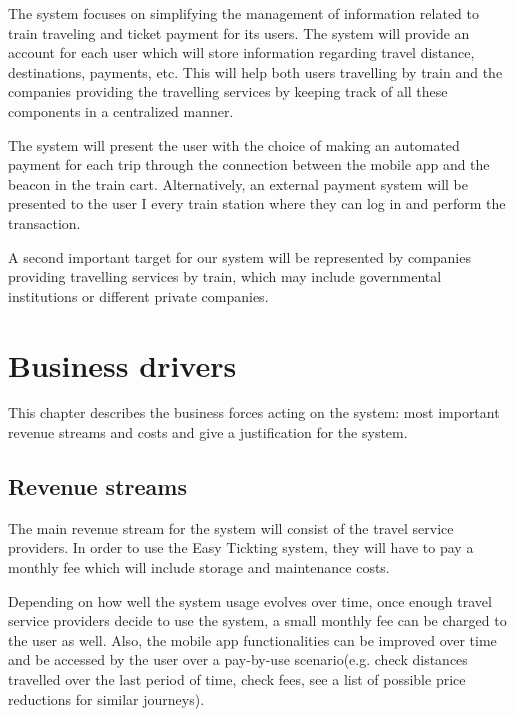 The system focuses on simplifying the management of information related to train traveling and ticket payment for its users. The system will provide an account for each user which will store information regarding travel distance, destinations, payments, etc. This will help both users travelling by train and the companies providing the travelling services by keeping track of all these components in a centralized manner. 

The system will present the user with the choice of making an automated payment for each trip through the connection between the mobile app and the beacon in the train cart. Alternatively, an external payment system will be presented to the user I every train station where they can log in and perform the transaction. 

A second important target for our system will be represented by companies providing travelling services by train, which may include governmental institutions or different private companies.

\section{Business drivers}
This chapter describes the business forces acting on the system: most important revenue streams and costs and give a justification for the system.

\subsection{Revenue streams}
The main revenue stream for the system will consist of the travel service providers. In order to use the Easy Tickting system, they will have to pay a monthly fee which will include storage and maintenance costs. 

Depending on how well the system usage evolves over time, once enough travel service providers decide to use the system, a small monthly fee can be charged to the user as well. Also, the mobile app functionalities can be improved over time and be accessed by the user over a pay-by-use scenario(e.g. check distances travelled over the last period of time, check fees, see a list of possible price reductions for similar journeys).

